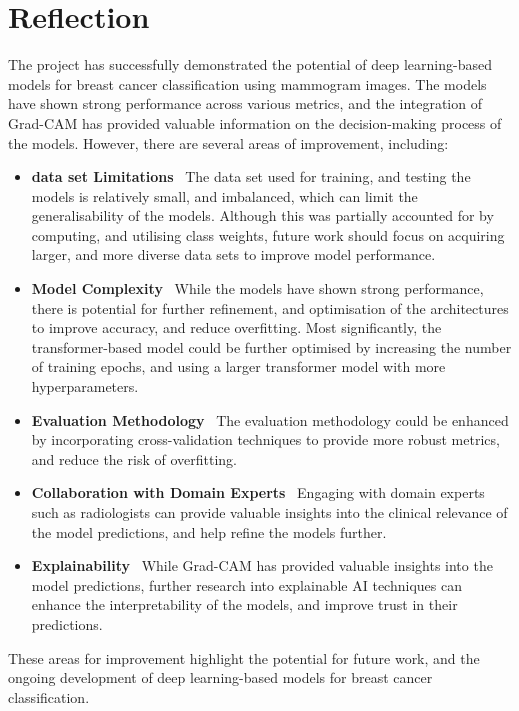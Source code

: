 \documentclass[../main]{subfiles}
\begin{document}
\section{Reflection}
\label{sec:reflection}
The project has successfully demonstrated the potential of deep learning-based models for breast cancer classification using mammogram images. The models have shown strong performance across various metrics, and the integration of Grad-CAM has provided valuable information on the decision-making process of the models. However, there are several areas of improvement, including:
\begin{itemize}
    \item \textbf{data set Limitations} \textemdash\ The data set used for training, and testing the models is relatively small, and imbalanced, which can limit the generalisability of the models. Although this was partially accounted for by computing, and utilising class weights, future work should focus on acquiring larger, and more diverse data sets to improve model performance.
    \item \textbf{Model Complexity} \textemdash\ While the models have shown strong performance, there is potential for further refinement, and optimisation of the architectures to improve accuracy, and reduce overfitting. Most significantly, the transformer-based model could be further optimised by increasing the number of training epochs, and using a larger transformer model with more hyperparameters.
    \item \textbf{Evaluation Methodology} \textemdash\ The evaluation methodology could be enhanced by incorporating cross-validation techniques to provide more robust metrics, and reduce the risk of overfitting.
    \item \textbf{Collaboration with Domain Experts} \textemdash\ Engaging with domain experts such as radiologists can provide valuable insights into the clinical relevance of the model predictions, and help refine the models further.
    \item \textbf{Explainability} \textemdash\ While Grad-CAM has provided valuable insights into the model predictions, further research into explainable AI techniques can enhance the interpretability of the models, and improve trust in their predictions.
\end{itemize}
These areas for improvement highlight the potential for future work, and the ongoing development of deep learning-based models for breast cancer classification.
\end{document}
